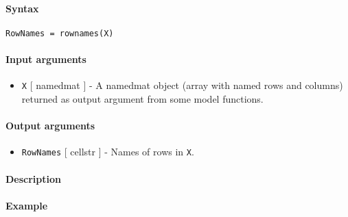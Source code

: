 


	\paragraph{Syntax}\label{syntax}

\begin{verbatim}
RowNames = rownames(X)
\end{verbatim}

\paragraph{Input arguments}\label{input-arguments}

\begin{itemize}
\itemsep1pt\parskip0pt
\item
  \texttt{X} {[} namedmat {]} - A namedmat object (array with named rows
  and columns) returned as output argument from some model functions.
\end{itemize}

\paragraph{Output arguments}\label{output-arguments}

\begin{itemize}
\itemsep1pt\parskip0pt
\item
  \texttt{RowNames} {[} cellstr {]} - Names of rows in \texttt{X}.
\end{itemize}

\paragraph{Description}\label{description}

\paragraph{Example}\label{example}



